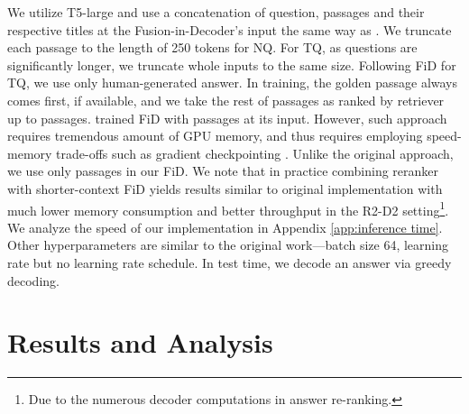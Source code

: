\documentclass[11pt]{article}
\begin{document}
\begin{description}[style=unboxed,leftmargin=0em,listparindent=\parindent]
\item[Generative reader.]
We utilize T5-large \cite{raffel2020exploring} and use a concatenation of question, passages and their respective titles at the Fusion-in-Decoder's input the same way as \citet{izacard2020distilling}.  
We truncate each passage to the length of 250 tokens for NQ. 
For TQ, as questions are significantly longer, we truncate whole inputs to the same size.
Following FiD for TQ, we use only human-generated answer. 
In training, the golden passage always comes first, if available, and we take the rest of passages as ranked by retriever up to  passages.
\citet{izacard2020leveraging} trained FiD with  passages at its input. However, such approach requires tremendous amount of GPU memory, and thus requires employing speed-memory trade-offs such as gradient checkpointing \cite{Chen2016TrainingDN}. Unlike the original approach, we use only  passages in our FiD. We note that in practice combining reranker with shorter-context FiD yields results similar to original implementation with much lower memory consumption and better throughput in the R2-D2 setting\footnote{Due to the numerous decoder computations in answer re-ranking.}. We analyze the speed of our implementation in Appendix \ref{app:inference time}. Other hyperparameters are similar to the original work---batch size 64, learning rate  but no learning rate schedule. 
In test time, we decode an answer via greedy decoding.
\end{description}


\section{Results and Analysis}
\end{document}
